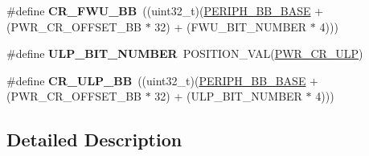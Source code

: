 \begin{DoxyCompactItemize}
\item 
\hypertarget{group___p_w_r___c_r__register__alias_gabb18fcdb192fee47b2545f6abd6de887}{\#define {\bfseries C\-R\-\_\-\-F\-W\-U\-\_\-\-B\-B}~((uint32\-\_\-t)(\hyperlink{group___peripheral__memory__map_gaed7efc100877000845c236ccdc9e144a}{P\-E\-R\-I\-P\-H\-\_\-\-B\-B\-\_\-\-B\-A\-S\-E} + (P\-W\-R\-\_\-\-C\-R\-\_\-\-O\-F\-F\-S\-E\-T\-\_\-\-B\-B $\ast$ 32) + (F\-W\-U\-\_\-\-B\-I\-T\-\_\-\-N\-U\-M\-B\-E\-R $\ast$ 4)))}\label{group___p_w_r___c_r__register__alias_gabb18fcdb192fee47b2545f6abd6de887}

\item 
\hypertarget{group___p_w_r___c_r__register__alias_ga9c87a777514ea28b9a6608c774e449dc}{\#define {\bfseries U\-L\-P\-\_\-\-B\-I\-T\-\_\-\-N\-U\-M\-B\-E\-R}~P\-O\-S\-I\-T\-I\-O\-N\-\_\-\-V\-A\-L(\hyperlink{group___peripheral___registers___bits___definition_ga14c19c1188ed2c42acbdba5759bc5e03}{P\-W\-R\-\_\-\-C\-R\-\_\-\-U\-L\-P})}\label{group___p_w_r___c_r__register__alias_ga9c87a777514ea28b9a6608c774e449dc}

\item 
\hypertarget{group___p_w_r___c_r__register__alias_ga0700629654927070dde219268a0dfb9d}{\#define {\bfseries C\-R\-\_\-\-U\-L\-P\-\_\-\-B\-B}~((uint32\-\_\-t)(\hyperlink{group___peripheral__memory__map_gaed7efc100877000845c236ccdc9e144a}{P\-E\-R\-I\-P\-H\-\_\-\-B\-B\-\_\-\-B\-A\-S\-E} + (P\-W\-R\-\_\-\-C\-R\-\_\-\-O\-F\-F\-S\-E\-T\-\_\-\-B\-B $\ast$ 32) + (U\-L\-P\-\_\-\-B\-I\-T\-\_\-\-N\-U\-M\-B\-E\-R $\ast$ 4)))}\label{group___p_w_r___c_r__register__alias_ga0700629654927070dde219268a0dfb9d}

\end{DoxyCompactItemize}


\subsection{Detailed Description}
